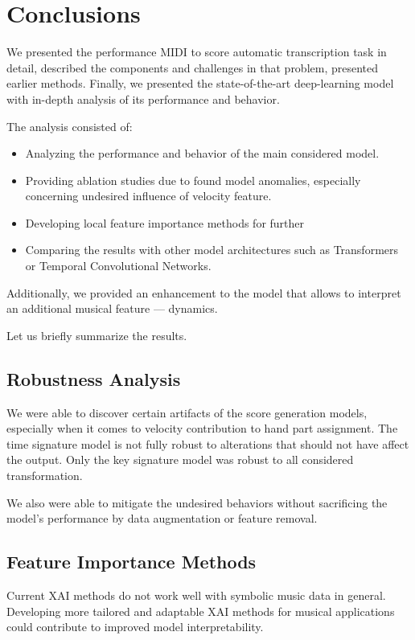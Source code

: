 \chapter{Conclusions}

We presented the performance MIDI to score automatic transcription task in detail, described the components and challenges in that problem, presented earlier methods. Finally, we presented the state-of-the-art deep-learning model with in-depth analysis of its performance and behavior.

The analysis consisted of: \begin{itemize}
	\item Analyzing the performance and behavior of the main considered model.
	\item Providing ablation studies due to found model anomalies, especially concerning undesired influence of velocity feature.
	\item Developing local feature importance methods for further 
	\item Comparing the results with other model architectures such as Transformers or Temporal Convolutional Networks.
\end{itemize}

Additionally, we provided an enhancement to the model that allows to interpret an additional musical feature --- dynamics. 

Let us briefly summarize the results.

\section{Robustness Analysis}

We were able to discover certain artifacts of the score generation models, especially when it comes to velocity contribution to hand part assignment. The time signature model is not fully robust to alterations that should not have affect the output. Only the key signature model was robust to all considered transformation.

We also were able to mitigate the undesired behaviors without sacrificing the model's performance by data augmentation or feature removal.

\section{Feature Importance Methods}

Current XAI methods do not work well with symbolic music data in general. Developing more tailored and adaptable XAI methods for musical applications could contribute to improved model interpretability. 

